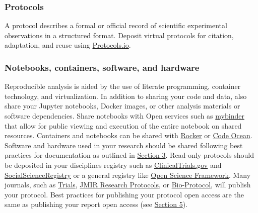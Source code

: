 \documentclass{article}
\begin{document}
\subsubsection{\textbf{Protocols}}\label{protocols}



A protocol describes a formal or official record of scientific experimental observations in a structured format. Deposit virtual protocols for citation, adaptation, and reuse using \href{https://www.protocols.io/}{Protocols.io}.


\subsubsection{\textbf{Notebooks, containers, software, and hardware}}\label{notebooks-containers-software-and-hardware}



Reproducible analysis is aided by the use of literate programming, container technology, and virtualization. In addition to sharing your code and data, also share your Jupyter notebooks, Docker images, or other analysis materials or software dependencies. Share notebooks with Open services such as \href{http://mybinder.org/}{mybinder} that allow for public viewing and execution of the entire notebook on shared resources. Containers and notebooks can be shared with \href{https://arxiv.org/abs/1710.03675}{Rocker} or \href{https://codeocean.com/}{Code Ocean}. Software and hardware used in your research should be shared following best practices for documentation as outlined in \href{https://github.com/Open-Science-Training-Handbook/Open-Science-Training-Handbook_EN/blob/master/02OpenScienceBasics/03OpenResearchSoftwareAndOpenSource.md}{Section 3}. Read-only protocols should be deposited in your disciplines registry such as \href{https://clinicaltrials.gov/}{ClinicalTrials.gov} and \href{https://www.socialscienceregistry.org/}{SocialScienceRegistry} or a general registry like \href{https://osf.io/}{Open Science Framework}. Many journals, such as \href{https://trialsjournal.biomedcentral.com/}{Trials}, \href{https://www.researchprotocols.org/}{JMIR Research Protocols}, or \href{https://bio-protocol.org/}{Bio-Protocol}, will publish your protocol. Best practices for publishing your protocol open access are the same as publishing your report open access (see \href{https://github.com/Open-Science-Training-Handbook/Open-Science-Training-Handbook_EN/blob/master/02OpenScienceBasics/05OpenAccessToPublishedResearchResults.md}{Section 5}).
\end{document}
